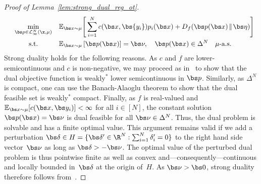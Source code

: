 \documentclass[11pt, a4paper, oneside, reqno]{article}
\begin{document}
\begin{proof}[Proof of Lemma~\ref{lem:strong_dual_reg_ot}]
\begin{equation}
\begin{array}{ccl}
		& \min\limits_{\bs p\in\mathcal L_\infty^N(\x,\mu)} &\displaystyle \mathbb{E}_{\bs x \sim \mu}\Bigg[ \sum\limits_{i=1}^Nc(\bs x, \bs {y_i})p_{i}(\bs x) +\displaystyle D_f (\bs p(\bs x) \! \parallel \!\bs \eta) \Bigg] \\[3ex]
		&\textrm{s.t.} &\displaystyle\mathbb{E}_{\bs x \sim \mu}\left[ \bs p(\bs x)\right] = \bs \nu,\quad \bs p(\bs x)\in\Delta^N \quad \mu\text{-a.s.}
		\end{array}
		\end{equation}
		Strong duality holds for the following reasons. As $c$ and $f$ are lower-semicontinuous and $c$ is non-negative, we may proceed as in~\citep[\S~3.2]{shapiro2017distributionally} to show that the dual objective function is weakly${}^*$ lower semicontinuous in $\bs p$. Similarly, as $\Delta^N$ is compact, one can use the Banach-Alaoglu theorem to show that the dual feasible set is weakly${}^*$ compact. Finally, as $f$ is real-valued and $\mathbb{E}_{\bs x \sim \mu}[c(\bs x,\bs y_i)]<\infty$ for all $i\in[N]$, the constant solution $\bs p(\bs x)=\bs \nu$ is dual feasible for all $\bs \nu \in\Delta^N$. Thus, the dual problem is solvable and has a finite optimal value. This argument remains valid if we add a perturbation $\bs \delta\in H=\{\bs\delta'\in\R^N: \sum_{i=1}^N\delta'_i=0\}$ to the right hand side vector~$\bs \nu$ as long as $\bs \delta>-\bs \nu$. The optimal value of the perturbed dual problem is thus pointwise finite as well as convex and---consequently---continuous and locally bounded in~$\bs \delta$ at the origin of~$H$. As $\bs \nu>\bs 0$, strong duality therefore follows from~\citep[Theorem~17\,(a)]{rockafellar1974conjugate}.

\end{proof}
\end{document}
